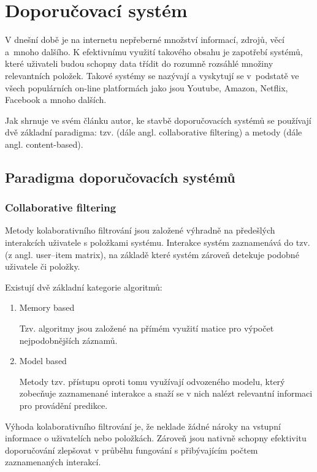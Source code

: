 \documentclass[thesis=M,czech]{FITthesis}[2019/12/23]
\begin{document}
\chapter{Doporučovací systém}

V dnešní době je na internetu nepřeberné množství informací, zdrojů, věcí a~mnoho dalšího. K efektivnímu využití takového obsahu je zapotřebí systémů, které uživateli budou schopny data třídit do rozumně rozsáhlé množiny relevantních položek. Takové systémy se nazývají  a vyskytují se v~podstatě ve všech populárních on-line platformách jako jsou Youtube, Amazon, Netflix, Facebook a mnoho dalších.

Jak shrnuje ve svém článku\cite{rocca2019} autor, ke stavbě doporučovacích systémů se používají dvě základní paradigma: tzv.  (dále angl. collaborative filtering) a  metody (dále angl. content-based).

\newpage
\section{Paradigma doporučovacích systémů}
\subsection{Collaborative filtering}

Metody kolaborativního filtrování jsou založené výhradně na předešlých interakcích uživatele s položkami systému. Interakce systém zaznamenává do tzv. (z angl. user--item matrix), na základě které systém zároveň detekuje podobné uživatele či položky.

Existují dvě základní kategorie algoritmů:
\begin{enumerate}
    \item Memory based
    
    Tzv.  algoritmy jsou založené na přímém využití matice pro výpočet nejpodobnějších záznamů.
    
    \item Model based
    
    Metody tzv.  přístupu oproti tomu využívají odvozeného modelu, který zobecňuje zaznamenané interakce a snaží se v nich nalézt relevantní informaci pro provádění predikce.
    
\end{enumerate}

Výhoda kolaborativního filtrování je, že neklade žádné nároky na vstupní informace o uživatelích nebo položkách. Zároveň jsou nativně schopny efektivitu doporučování zlepšovat v průběhu fungování s přibývajícím počtem zaznamenaných interakcí.
\end{document}
